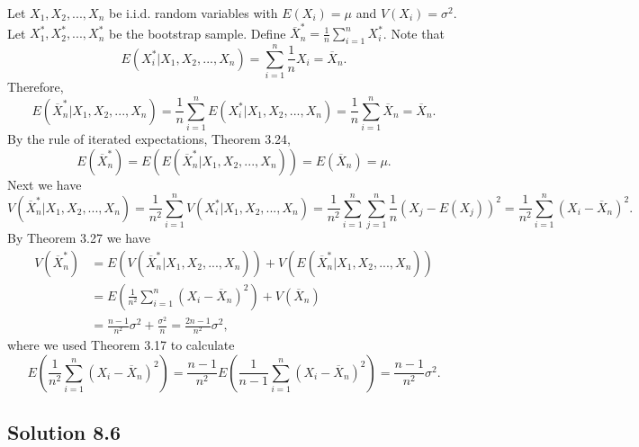 Let $X_1, X_2, ..., X_n$ be i.i.d. random variables with $E(X_i) = \mu$ and $V(X_i) = \sigma^2$.
Let $X_1^*, X_2^*, ..., X_n^*$ be the bootstrap sample.
Define $\overline{X}_n^* = \frac{1}{n} \sum_{i=1}^n X_i^*$.
Note that
\begin{equation*}
    E(X^*_i | X_1, X_2, ..., X_n)
        = \sum_{i = 1}^n \frac{1}{n} X_i
        = \overline{X}_n.
\end{equation*}
Therefore,
\begin{equation*}
    E(\overline{X}_n^* | X_1, X_2, ..., X_n)
        = \frac{1}{n} \sum_{i = 1}^n E(X_i^* | X_1, X_2, ..., X_n)
        = \frac{1}{n} \sum_{i = 1}^n \overline{X}_n
        = \overline{X}_n.
\end{equation*}
By the rule of iterated expectations, Theorem 3.24,
\begin{equation*}
    E(\overline{X}_n^*)
        = E(E(\overline{X}_n^* | X_1, X_2, ..., X_n))
        = E(\overline{X}_n)
        = \mu.
\end{equation*}
Next we have
\begin{equation*}
    V(\overline{X}_n^*|X_1, X_2, ..., X_n)
        = \frac{1}{n^2} \sum_{i = 1}^n V(X_i^*|X_1, X_2, ..., X_n)
        = \frac{1}{n^2} \sum_{i = 1}^n \sum_{j = 1}^n \frac{1}{n} (X_j - E(X_j))^2
        = \frac{1}{n^2} \sum_{i = 1}^n (X_i - \overline{X}_n)^2.
\end{equation*}
By Theorem 3.27 we have
\begin{equation*}
    \begin{split}
        V(\overline{X}_n^*)
            &= E(V(\overline{X}_n^*|X_1, X_2, ..., X_n)) + V(E(\overline{X}_n^*|X_1, X_2, ..., X_n)) \\
            &= E\left(\frac{1}{n^2} \sum_{i = 1}^n (X_i - \overline{X}_n)^2\right) + V(\overline{X}_n) \\
            &= \frac{n - 1}{n^2} \sigma^2 + \frac{\sigma^2}{n}
            = \frac{2n - 1}{n^2} \sigma^2,
    \end{split}
\end{equation*}
where we used Theorem 3.17 to calculate
\begin{equation*}
    E\left(\frac{1}{n^2} \sum_{i = 1}^n (X_i - \overline{X}_n)^2\right)
        = \frac{n - 1}{n^2} E\left( \frac{1}{n - 1} \sum_{i = 1}^n (X_i - \overline{X}_n)^2 \right)
        = \frac{n - 1}{n^2} \sigma^2.
\end{equation*}


\subsection*{Solution 8.6}

